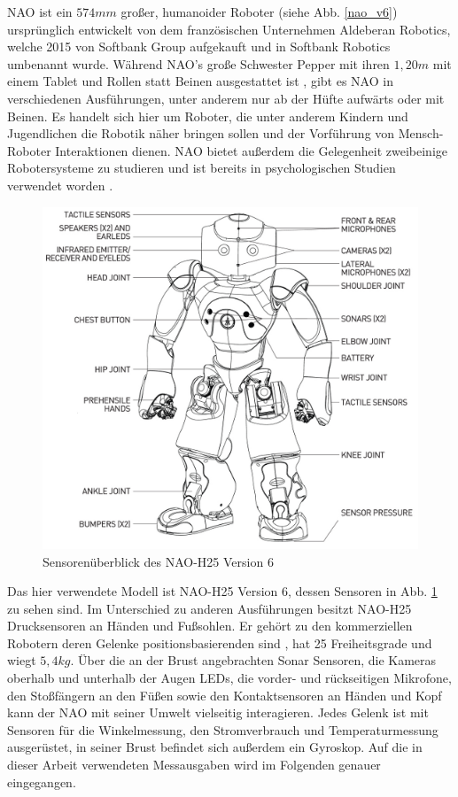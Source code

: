NAO ist ein $574 \unit{mm}$ großer, humanoider Roboter (siehe Abb. \ref{nao_v6}) ursprünglich entwickelt von dem französischen Unternehmen Aldeberan Robotics, welche 2015 von Softbank Group aufgekauft \cite{aldebaran_to_softbank} und in Softbank Robotics umbenannt wurde. Während NAO's große Schwester Pepper mit ihren $1,20 \unit{m}$ mit einem Tablet und Rollen statt Beinen ausgestattet ist \cite{about_pepper}, gibt es NAO in verschiedenen Ausführungen, unter anderem nur ab der Hüfte aufwärts oder mit Beinen. Es handelt sich hier um Roboter, die unter anderem Kindern und Jugendlichen die Robotik näher bringen sollen und der Vorführung von Mensch-Roboter Interaktionen dienen. NAO bietet außerdem die Gelegenheit zweibeinige Robotersysteme zu studieren und ist bereits in psychologischen Studien verwendet worden \cite{SHAMSUDDIN20121533}. 

\begin{figure}[hb]
	\centering
	\vspace{2cm}
	\includegraphics[width=0.7\linewidth]{Bilder/nao_h25_pres.png}
	\caption{Sensorenüberblick des NAO-H25 Version 6 \cite[in /H25]{nao_naoqi_docu}}
	\label{nao_v6_h25}
\end{figure}  

Das hier verwendete Modell ist NAO-H25 Version 6, dessen Sensoren in Abb. \ref{nao_v6_h25} zu sehen sind. Im Unterschied zu anderen Ausführungen besitzt NAO-H25 Drucksensoren an Händen und Fußsohlen. Er gehört zu den kommerziellen Robotern deren Gelenke positionsbasierenden sind \cite{balance_strategy}, hat 25 Freiheitsgrade und wiegt $5,4\unit{kg}$. Über die an der Brust angebrachten Sonar Sensoren, die Kameras oberhalb und unterhalb der Augen LEDs, die vorder- und rückseitigen Mikrofone, den Stoßfängern an den Füßen sowie den Kontaktsensoren an Händen und Kopf kann der NAO mit seiner Umwelt vielseitig interagieren. Jedes Gelenk ist mit Sensoren für die Winkelmessung, den Stromverbrauch und Temperaturmessung ausgerüstet, in seiner Brust befindet sich außerdem ein Gyroskop. Auf die in dieser Arbeit verwendeten Messausgaben wird im Folgenden genauer eingegangen.

